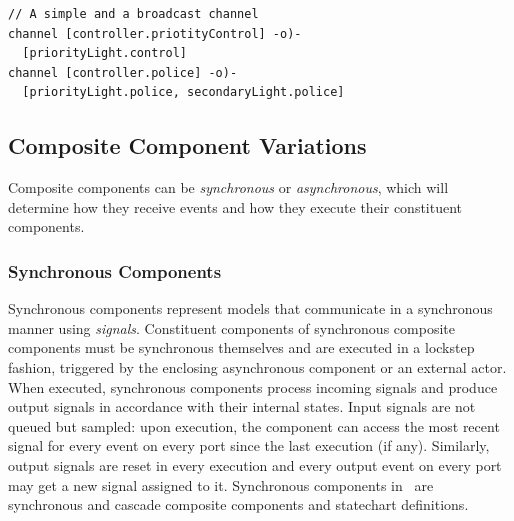 
\begin{lstlisting}
// A simple and a broadcast channel
channel [controller.priotityControl] -o)-
  [priorityLight.control]
channel [controller.police] -o)-
  [priorityLight.police, secondaryLight.police]
\end{lstlisting}

\subsection{Composite Component Variations}
\label{sec:composite}

Composite components can be \emph{synchronous} or \emph{asynchronous}, which will determine how they receive events and how they execute their constituent components.

\subsubsection{Synchronous Components}
Synchronous components represent models that communicate
in a synchronous manner using \emph{signals}. Constituent components of synchronous composite components must be synchronous themselves and are executed in a lockstep fashion, triggered by the enclosing asynchronous component or an external actor.
When executed, synchronous components process incoming signals
and produce output signals in accordance with their internal states. Input signals are not queued but sampled: upon execution, the component can access the most recent signal for every event on every port since the last execution (if any). Similarly, output signals are reset in every execution and every output event on every port may get a new signal assigned to it.
Synchronous components in \gamma\ are synchronous and cascade composite components and statechart definitions.%


